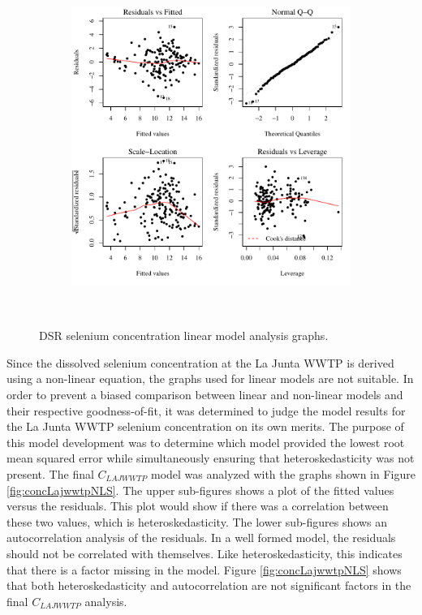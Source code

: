\subfiguremid
\begin{landscape}
	\begin{figure}
		\begin{subfigure}{0.7\textwidth}
			\centering
			\includegraphics[width=\tableCustomSize]{"Figures/Results_DSR/Stochastic/Conc Model lm-fit DDIV"}
		\end{subfigure}\\
		\caption{DSR selenium concentration linear model analysis graphs.}
	\end{figure}
\end{landscape}
\subfiguretop

Since the dissolved selenium concentration at the La Junta WWTP is derived using a non-linear equation, the graphs used for linear models are not suitable.  In order to prevent a biased comparison between linear and non-linear models and their respective goodness-of-fit, it was determined to judge the model results for the La Junta WWTP selenium concentration on its own merits.  The purpose of this model development was to determine which model provided the lowest root mean squared error while simultaneously ensuring that heteroskedasticity was not present.  The final $ C_{LAJWWTP} $ model was analyzed with the graphs shown in Figure \ref{fig:concLajwwtpNLS}.  The upper sub-figures shows a plot of the fitted values versus the residuals.  This plot would show if there was a correlation between these two values, which is heteroskedasticity.  The lower sub-figures shows an autocorrelation analysis of the residuals.  In a well formed model, the residuals should not be correlated with themselves.  Like heteroskedasticity, this indicates that there is a factor missing in the model.  Figure \ref{fig:concLajwwtpNLS} shows that both heteroskedasticity and autocorrelation are not significant factors in the final $ C_{LAJWWTP} $ analysis.

